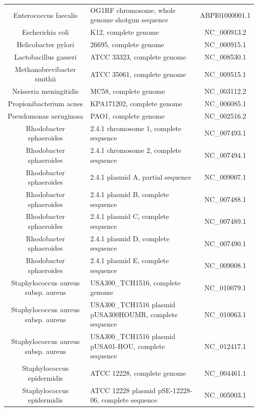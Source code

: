 \documentclass[10pt]{bmc_article}
\newenvironment{bmcformat}{\begin{raggedright}\baselineskip20pt\sloppy\setboolean{publ}{false}}{\end{raggedright}\baselineskip20pt\sloppy}
\begin{document}
\begin{bmcformat}
{\begin{tabular}{|c|p{5cm}|c|}
        Enterococcus faecalis & OG1RF chromosome, whole genome shotgun sequence &  ABPI01000001.1 \\
        Escherichia coli & K12, complete genome &  NC\_000913.2 \\
        Helicobacter pylori & 26695, complete genome &     NC\_000915.1 \\ 
        Lactobacillus gasseri & ATCC 33323, complete genome &      NC\_008530.1 \\
        Methanobrevibacter smithii & ATCC 35061, complete genome &  NC\_009515.1 \\
        Neisseria meningitidis & MC58, complete genome &   NC\_003112.2 \\
        Propionibacterium acnes & KPA171202, complete genome &     NC\_006085.1 \\
        Pseudomonas aeruginosa &  PAO1, complete genome &   NC\_002516.2 \\
        Rhodobacter sphaeroides & 2.4.1 chromosome 1, complete sequence &  NC\_007493.1 \\
        Rhodobacter sphaeroides & 2.4.1 chromosome 2, complete sequence &  NC\_007494.1 \\
        Rhodobacter sphaeroides & 2.4.1 plasmid A, partial sequence &      NC\_009007.1 \\
        Rhodobacter sphaeroides & 2.4.1 plasmid B, complete sequence &     NC\_007488.1 \\
        Rhodobacter sphaeroides & 2.4.1 plasmid C, complete sequence &     NC\_007489.1 \\
        Rhodobacter sphaeroides & 2.4.1 plasmid D, complete sequence &     NC\_007490.1 \\
        Rhodobacter sphaeroides & 2.4.1 plasmid E, complete sequence &     NC\_009008.1 \\
        Staphylococcus aureus subsp. aureus & USA300\_TCH1516, complete genome &    NC\_010079.1 \\
        Staphylococcus aureus subsp. aureus & USA300\_TCH1516 plasmid pUSA300HOUMR, complete sequence &      NC\_010063.1 \\
        Staphylococcus aureus subsp. aureus & USA300\_TCH1516 plasmid pUSA01-HOU, complete sequence &       NC\_012417.1 \\
        Staphylococcus epidermidis & ATCC 12228, complete genome &  NC\_004461.1 \\
        Staphylococcus epidermidis & ATCC 12228 plasmid pSE-12228-06, complete sequence &   NC\_005003.1 \\

\end{tabular}}
\end{bmcformat}
\end{document}

